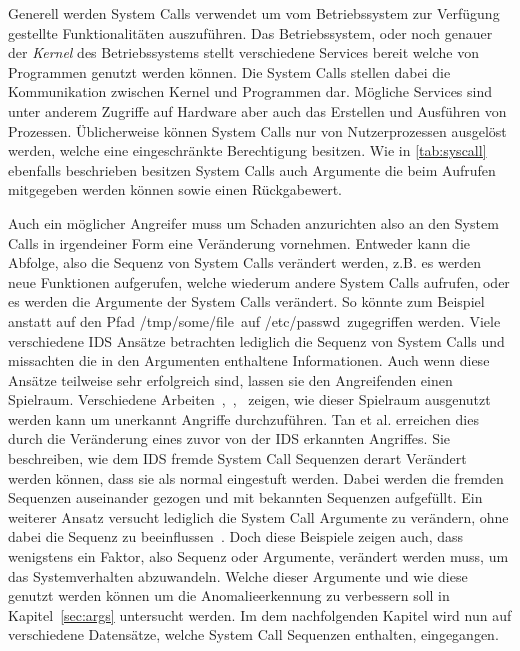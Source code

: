         Generell werden System Calls verwendet um vom Betriebssystem zur Verfügung gestellte Funktionalitäten auszuführen.
        Das Betriebssystem, oder noch genauer der \textit{Kernel}  des Betriebssystems stellt verschiedene Services bereit welche von Programmen genutzt werden können. 
        Die System Calls stellen dabei die Kommunikation zwischen Kernel und Programmen dar.
        Mögliche Services sind unter anderem Zugriffe auf Hardware aber auch das Erstellen und Ausführen von Prozessen.
        Üblicherweise können System Calls nur von Nutzerprozessen ausgelöst werden, welche eine eingeschränkte Berechtigung besitzen.
        Wie in \autoref{tab:syscall} ebenfalls beschrieben besitzen System Calls auch Argumente die beim Aufrufen mitgegeben werden können sowie einen Rückgabewert.

        Auch ein möglicher Angreifer muss um Schaden anzurichten also an den System Calls in irgendeiner Form eine Veränderung vornehmen.
        Entweder kann die Abfolge, also die Sequenz von System Calls verändert werden, z.B. es werden neue Funktionen aufgerufen, welche wiederum andere System Calls aufrufen,
        oder es werden die Argumente der System Calls verändert.
        So könnte zum Beispiel anstatt auf den Pfad \glqq /tmp/some/file\grqq \ auf \glqq /etc/passwd\grqq \ zugegriffen werden. 
        Viele verschiedene IDS Ansätze betrachten lediglich die Sequenz von System Calls und missachten die in den Argumenten enthaltene Informationen.
        Auch wenn diese Ansätze teilweise sehr erfolgreich sind, lassen sie den Angreifenden einen Spielraum.
        Verschiedene Arbeiten~\cite{Syscallseqexploit1},~\cite{Syscallseqexploit2},~\cite{Syscallseqexploit3} zeigen, wie dieser Spielraum ausgenutzt werden kann um unerkannt Angriffe durchzuführen. 
        Tan et al. \cite{Syscallseqexploit3} erreichen dies durch die Veränderung eines zuvor von der IDS erkannten Angriffes.
        Sie beschreiben, wie dem IDS fremde System Call Sequenzen derart Verändert werden können, dass sie als normal eingestuft werden.
        Dabei werden die fremden Sequenzen auseinander gezogen und mit bekannten Sequenzen aufgefüllt. 
        Ein weiterer Ansatz versucht lediglich die System Call Argumente zu verändern, ohne dabei die Sequenz zu beeinflussen~\cite{Syscallseqexploit1}.
        Doch diese Beispiele zeigen auch, dass wenigstens ein Faktor, also Sequenz oder Argumente, verändert werden muss, um das Systemverhalten abzuwandeln.
        Welche dieser Argumente und wie diese genutzt werden können um die Anomalieerkennung zu verbessern soll in Kapitel~\ref{sec:args} untersucht werden.
        Im dem nachfolgenden Kapitel wird nun auf verschiedene Datensätze, welche System Call Sequenzen enthalten, eingegangen.

